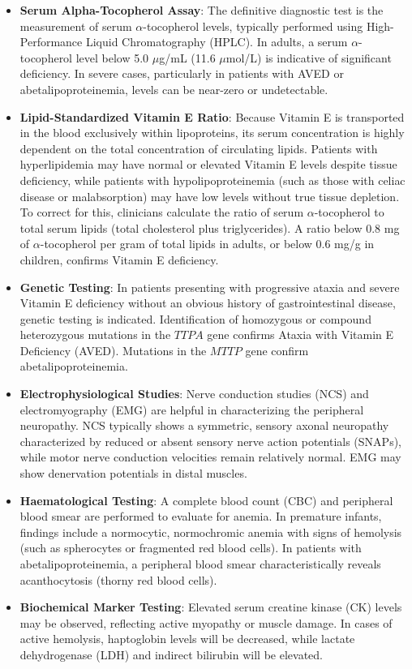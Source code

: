 \begin{itemize}
    \item \textbf{Serum Alpha-Tocopherol Assay}: The definitive diagnostic test is the measurement of serum $\alpha$-tocopherol levels, typically performed using High-Performance Liquid Chromatography (HPLC). In adults, a serum $\alpha$-tocopherol level below 5.0 $\mu$g/mL (11.6 $\mu$mol/L) is indicative of significant deficiency. In severe cases, particularly in patients with AVED or abetalipoproteinemia, levels can be near-zero or undetectable.
    \item \textbf{Lipid-Standardized Vitamin E Ratio}: Because Vitamin E is transported in the blood exclusively within lipoproteins, its serum concentration is highly dependent on the total concentration of circulating lipids. Patients with hyperlipidemia may have normal or elevated Vitamin E levels despite tissue deficiency, while patients with hypolipoproteinemia (such as those with celiac disease or malabsorption) may have low levels without true tissue depletion. To correct for this, clinicians calculate the ratio of serum $\alpha$-tocopherol to total serum lipids (total cholesterol plus triglycerides). A ratio below 0.8 mg of $\alpha$-tocopherol per gram of total lipids in adults, or below 0.6 mg/g in children, confirms Vitamin E deficiency.
    \item \textbf{Genetic Testing}: In patients presenting with progressive ataxia and severe Vitamin E deficiency without an obvious history of gastrointestinal disease, genetic testing is indicated. Identification of homozygous or compound heterozygous mutations in the $TTPA$ gene confirms Ataxia with Vitamin E Deficiency (AVED). Mutations in the $MTTP$ gene confirm abetalipoproteinemia.
    \item \textbf{Electrophysiological Studies}: Nerve conduction studies (NCS) and electromyography (EMG) are helpful in characterizing the peripheral neuropathy. NCS typically shows a symmetric, sensory axonal neuropathy characterized by reduced or absent sensory nerve action potentials (SNAPs), while motor nerve conduction velocities remain relatively normal. EMG may show denervation potentials in distal muscles.
    \item \textbf{Haematological Testing}: A complete blood count (CBC) and peripheral blood smear are performed to evaluate for anemia. In premature infants, findings include a normocytic, normochromic anemia with signs of hemolysis (such as spherocytes or fragmented red blood cells). In patients with abetalipoproteinemia, a peripheral blood smear characteristically reveals acanthocytosis (thorny red blood cells).
    \item \textbf{Biochemical Marker Testing}: Elevated serum creatine kinase (CK) levels may be observed, reflecting active myopathy or muscle damage. In cases of active hemolysis, haptoglobin levels will be decreased, while lactate dehydrogenase (LDH) and indirect bilirubin will be elevated.
\end{itemize}

